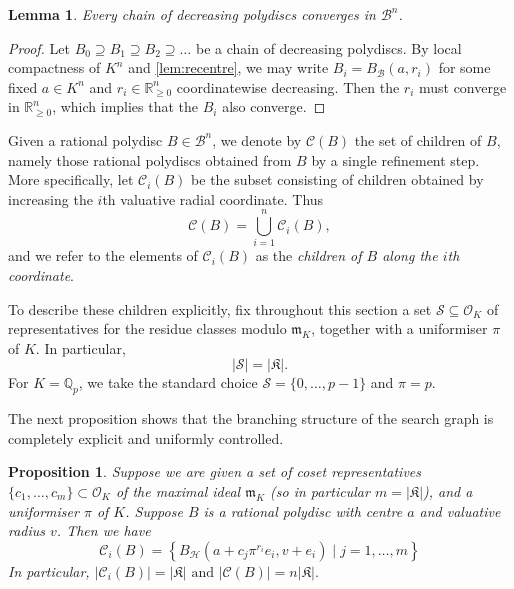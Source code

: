 \documentclass[10pt]{article}
\newtheorem{lemma}[theorem]{Lemma}
\newtheorem{proposition}[theorem]{Proposition}
\theoremstyle{definition}
\newcommand{\RR}{\mathbb{R}}
\newcommand{\QQ}{\mathbb{Q}}
\begin{document}
\begin{lemma}
  Every chain of decreasing polydiscs converges in $\mathcal B^n$.
\end{lemma}

\begin{proof}
  Let $B_0 \supseteq B_1 \supseteq B_2 \supseteq \dots $ be a chain of decreasing polydiscs.  By local compactness of $K^n$ and \cref{lem:recentre}, we may write $B_i=B_{\mathcal B}(a,r_i)$ for some fixed $a\in K^n$ and $r_i\in\RR_{\geq 0}^n$ coordinatewise decreasing.  Then the $r_i$ must converge in $\RR_{\geq 0}^n$, which implies that the $B_i$ also converge.
\end{proof}


Given a rational polydisc $B \in \mathcal{B}^n$, we denote by $\mathcal{C}(B)$ the set of children of $B$, namely those rational polydiscs obtained from $B$ by a single refinement step. More specifically, let $\mathcal{C}_i(B)$ be the subset consisting of children obtained by increasing the $i$th valuative radial coordinate. Thus
$$
\mathcal{C}(B)=\bigcup_{i=1}^n \mathcal{C}_i(B),
$$
and we refer to the elements of $\mathcal{C}_i(B)$ as the \emph{children of $B$ along the $i$th coordinate}.

To describe these children explicitly, fix throughout this section a set $\mathcal S \subseteq \mathcal O_K$ of representatives for the residue classes modulo $\mathfrak m_K$, together with a uniformiser $\pi$ of $K$. In particular,
$$
|\mathcal S|=|\mathfrak K|.
$$
For $K=\QQ_p$, we take the standard choice $\mathcal S=\{0,\dotsc,p-1\}$ and $\pi=p$.

The next proposition shows that the branching structure of the search graph is completely explicit and uniformly controlled.

\begin{proposition}
 Suppose we are given a set of coset representatives $\{c_1, \dotsc, c_m \} \subset \mathcal{O}_K$ of the maximal ideal $\mathfrak{m}_K$ (so in particular $m = \lvert \mathfrak{K} \rvert$), and a uniformiser $\pi$ of $K$. Suppose $B$ is a rational polydisc with centre $a$ and valuative radius $v$. Then we have 
    \begin{equation}
    \label{eq:children_coset}
        \mathcal{C}_i(B) = \left\{ B_{\mathcal{H}}(a + c_j \pi ^ {r_i} e_i, v + e_i) \mid j = 1, \dotsc, m \right\}
    \end{equation}
    In particular, 
    $
        \lvert \mathcal{C}_i(B) \rvert = \lvert \mathfrak{K} \rvert
    \text{ and }
    \lvert \mathcal{C}(B) \rvert = n \lvert \mathfrak{K} \rvert.
    $
\end{proposition}
\end{document}
